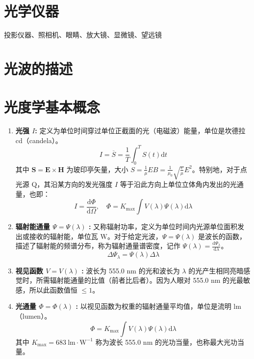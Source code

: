 \documentclass[UTF8]{report}
\theoremstyle{MyLineTheoremStyle} %
\theoremstyle{MyBlockTheoremStyle} %
\theoremstyle{MySubsubsectionStyle} %
\begin{document}
\section{光学仪器}

投影仪器、照相机、眼睛、放大镜、显微镜、望远镜

\section{光波的描述}
\section{光度学基本概念}

\begin{enumerate}[label=\bfseries(\arabic*)]
\item \textbf{光强 $I$:} 定义为单位时间穿过单位正截面的光（电磁波）能量，单位是坎德拉 cd（candela）。
\begin{equation}
I = \overline{S} = \frac{1}{T} \int_{0}^{T} S(t) \mathrm{d}t
\end{equation}
其中 $\boldsymbol{S} = \boldsymbol{E} \times \boldsymbol{H}$ 为玻印亭矢量，大小 $S = \frac{1}{\mu}EB = \frac{1}{\mu_0} \sqrt{\frac{\varepsilon}{\mu}} E^2 $。特别地，对于点光源 Q，其沿某方向的发光强度 $I$ 等于沿此方向上单位立体角内发出的光通量，也即：
\begin{equation}
I = \frac{\mathrm{d}\Phi}{\mathrm{d}\Omega}, \quad \Phi = K_{\text{max}} \int V(\lambda) \Psi(\lambda) \mathrm{d}\lambda
\end{equation}

\item \textbf{辐射能通量 $\Psi = \Psi(\lambda)$ :} 
又称辐射功率，定义为单位时间内光源单位面积发出或接收的辐射能，单位瓦 $\mathrm{W}$。对于给定光波，$\Psi = \Psi(\lambda)$ 是波长的函数，描述了辐射能的频谱分布，称为辐射通量谱密度，记作 $ \Psi(\lambda) = \frac{\mathrm{d}\Psi_{\lambda}}{\mathrm{d}\lambda} $。
\begin{equation}
\Delta \Psi_{\lambda} = \Psi(\lambda) \Delta \lambda
\end{equation}

\item \textbf{视见函数 $V = V(\lambda)$ :} 
波长为 555.0 nm 的光和波长为 $\lambda$ 的光产生相同亮暗感觉时，所需辐射能通量的比值（前者比后者）。因为人眼对 555.0 nm 的光最敏感，所以此函数值恒 $\leqslant 1$。

\item \textbf{光通量 $\Phi = \Phi(\lambda)$ :} 
以视见函数为权重的辐射通量平均值，单位是流明 lm（lumen）。
\begin{equation}
    \Phi = K_{\text{max}} \int V(\lambda) \Psi(\lambda) \mathrm{d}\lambda
\end{equation}
其中 $K_{\text{max}}= 683\ \mathrm{lm\cdot W^{-1}}$ 称为波长 555.0 nm 的光功当量，也称最大光功当量。


\end{enumerate}
\end{document}
